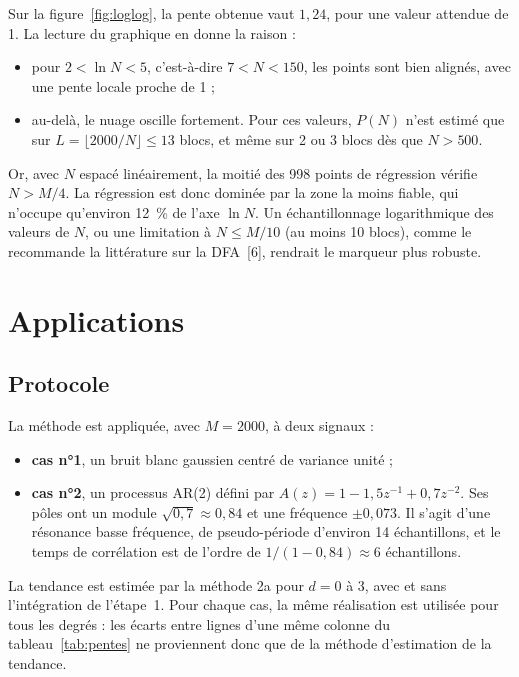 \documentclass[11pt,a4paper]{article}
\begin{document}
Sur la figure~\ref{fig:loglog}, la pente obtenue vaut $1{,}24$, pour une valeur attendue de 1. La lecture du graphique en donne la raison :
\begin{itemize}
  \item pour $2 < \ln N < 5$, c'est-à-dire $7 < N < 150$, les points sont bien alignés, avec une pente locale proche de 1 ;
  \item au-delà, le nuage oscille fortement. Pour ces valeurs, $P(N)$ n'est estimé que sur $L = \lfloor 2000/N \rfloor \leq 13$ blocs, et même sur 2 ou 3 blocs dès que $N > 500$.
\end{itemize}
Or, avec $N$ espacé linéairement, la moitié des 998 points de régression vérifie $N > M/4$. La régression est donc dominée par la zone la moins fiable, qui n'occupe qu'environ 12~\% de l'axe $\ln N$. Un échantillonnage logarithmique des valeurs de $N$, ou une limitation à $N \leq M/10$ (au moins 10 blocs), comme le recommande la littérature sur la DFA~[6], rendrait le marqueur plus robuste.

\section{Applications}
\label{sec:applications}

\subsection{Protocole}

La méthode est appliquée, avec $M = 2000$, à deux signaux :
\begin{itemize}
  \item \textbf{cas n°1}, un bruit blanc gaussien centré de variance unité ;
  \item \textbf{cas n°2}, un processus AR(2) défini par $A(z) = 1 - 1{,}5z^{-1} + 0{,}7z^{-2}$. Ses pôles ont un module $\sqrt{0{,}7} \approx 0{,}84$ et une fréquence $\pm 0{,}073$. Il s'agit d'une résonance basse fréquence, de pseudo-période d'environ 14 échantillons, et le temps de corrélation est de l'ordre de $1/(1-0{,}84) \approx 6$ échantillons.
\end{itemize}
La tendance est estimée par la méthode 2a pour $d = 0$ à 3, avec et sans l'intégration de l'étape~1. Pour chaque cas, la même réalisation est utilisée pour tous les degrés : les écarts entre lignes d'une même colonne du tableau~\ref{tab:pentes} ne proviennent donc que de la méthode d'estimation de la tendance.
\end{document}
